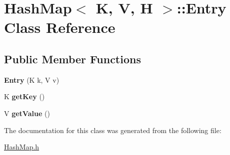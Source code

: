 \hypertarget{class_hash_map_1_1_entry}{\section{Hash\-Map$<$ K, V, H $>$\-:\-:Entry Class Reference}
\label{class_hash_map_1_1_entry}
}
\subsection*{Public Member Functions}
\begin{DoxyCompactItemize}
\item 
\hypertarget{class_hash_map_1_1_entry_a812efde719ae342c6c8106a8111872b9}{{\bfseries Entry} (K k, V v)}\label{class_hash_map_1_1_entry_a812efde719ae342c6c8106a8111872b9}

\item 
\hypertarget{class_hash_map_1_1_entry_acbddb2f4e1621c56e415318ee17f3a33}{K {\bfseries get\-Key} ()}\label{class_hash_map_1_1_entry_acbddb2f4e1621c56e415318ee17f3a33}

\item 
\hypertarget{class_hash_map_1_1_entry_a859e03cb8fb571e4f5ecee050664a2d5}{V {\bfseries get\-Value} ()}\label{class_hash_map_1_1_entry_a859e03cb8fb571e4f5ecee050664a2d5}

\end{DoxyCompactItemize}


The documentation for this class was generated from the following file\-:\begin{DoxyCompactItemize}
\item 
\hyperlink{_hash_map_8h}{Hash\-Map.\-h}\end{DoxyCompactItemize}

